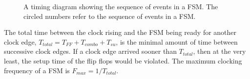 \begin{figure}[ht]

\caption{A timing diagram showing the sequence of events in a FSM.
The circled numbers refer to the sequence of events in a FSM.}
\label{fig:GenTime}

\end{figure}
\label{page:GenTime}

The total time between the clock rising and the FSM being ready for another 
clock edge, $T_{total} = T_{FF} + T_{combo} + T_{su}$,  is the minimal 
amount of time between successive clock edges.  If a clock edge arrived 
sooner than $T_{total}$, then at the very least, the setup time of the 
flip flops would be violated.  The maximum clocking frequency 
of a FSM is $F_{max} = 1/T_{total}$.

